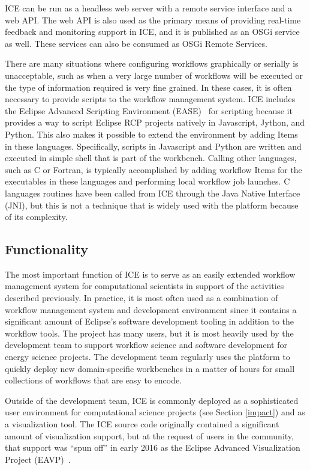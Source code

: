 ICE can be run as a headless web server with a remote service interface and a web
API. The web API is also used as the primary means of providing real-time 
feedback and monitoring support in ICE, and it is published as an OSGi service as well. These services can also be consumed as OSGi Remote Services.

There are many situations where configuring workflows graphically or serially is
unacceptable, such as when a very large number of workflows will be
executed or the type of information required is very fine grained. In
these cases, it is often necessary to provide scripts to the workflow
management system. ICE includes the Eclipse Advanced Scripting
Environment (EASE)~\cite{pontesegger_eclipse_2015} for scripting because it
provides a way to script Eclipse RCP projects natively in Javascript,
Jython, and Python. This also makes it possible to extend the
environment by adding Items in these languages. Specifically, scripts in Javascript and Python are written and executed in simple shell that is part of the workbench. Calling other languages, such as C or Fortran, is typically accomplished by adding workflow Items for the executables in these languages and performing local workflow job launches. C languages routines have been called from ICE through the Java Native Interface (JNI), but this is not a technique that is widely used with the platform because of its complexity.

\subsection{Functionality}\label{software-functionalities}

The most important function of ICE is to serve as an easily extended
workflow management system for computational scientists in support of
the activities described previously. In practice, it is most often used as a
combination of workflow management system and development environment
since it contains a significant amount of Eclipse's software development
tooling in addition to the workflow tools. The project has many users,
but it is most heavily used by the development team to support workflow
science and software development for energy science projects. The
development team regularly uses the platform to quickly deploy new
domain-specific workbenches in a matter of hours for small collections
of workflows that are easy to encode.

Outside of the development team, ICE is commonly deployed as a
sophisticated user environment for computational science projects 
(see Section \ref{impact}) and as a visualization tool. The ICE source code originally contained a
significant amount of visualization support, but at the request of users
in the community, that support was ``spun off'' in early 2016 as the 
Eclipse Advanced Visualization Project (EAVP)~\cite{billings_eclipse_2015}.

